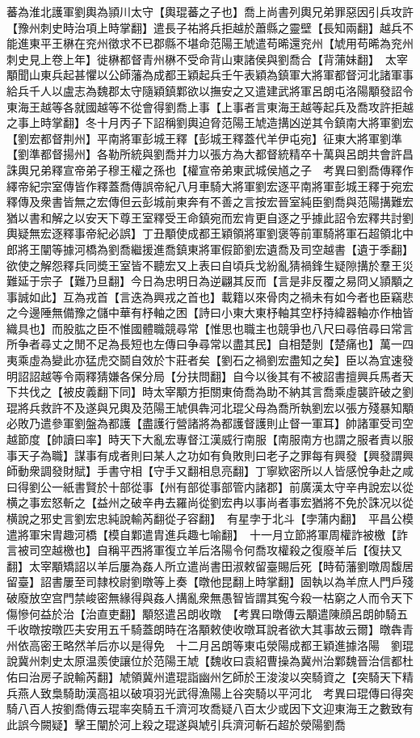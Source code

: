 蕃為淮北護軍劉輿為頴川太守【輿琨蕃之子也】喬上尚書列輿兄弟罪惡因引兵攻許【豫州刺史時治項上時掌翻】遣長子祐將兵拒越於蕭縣之靈壁【長知兩翻】越兵不能進東平王楙在兖州徵求不已郡縣不堪命范陽王虓遣苟晞還兖州【虓用苟晞為兖州刺史見上卷上年】徙楙都督青州楙不受命背山東諸侯與劉喬合【背蒲妹翻】　太宰顒聞山東兵起甚懼以公師藩為成都王穎起兵壬午表穎為鎮軍大將軍都督河北諸軍事給兵千人以盧志為魏郡太守隨穎鎮鄴欲以撫安之又遣建武將軍呂朗屯洛陽顒發詔令東海王越等各就國越等不從會得劉喬上事【上事者言東海王越等起兵及喬攻許拒越之事上時掌翻】冬十月丙子下詔稱劉輿迫脅范陽王虓造搆凶逆其令鎮南大將軍劉宏【劉宏都督荆州】平南將軍彭城王釋【彭城王釋蓋代羊伊屯宛】征東大將軍劉準【劉準都督揚州】各勒所統與劉喬并力以張方為大都督統精卒十萬與呂朗共會許昌誅輿兄弟釋宣帝弟子穆王權之孫也【權宣帝弟東武城侯馗之子　考異曰劉喬傳釋作繹帝紀宗室傳皆作釋蓋喬傳誤帝紀八月車騎大將軍劉宏逐平南將軍彭城王釋于宛宏釋傳及衆書皆無之宏傳但云彭城前東奔有不善之言按宏晉室純臣劉喬與范陽搆難宏猶以書和解之以安天下尊王室釋受王命鎮宛而宏肯更自逐之乎據此詔令宏釋共討劉輿疑無宏逐釋事帝紀必誤】丁丑顒使成都王穎領將軍劉褒等前軍騎將軍石超領北中郎將王闡等據河橋為劉喬繼援進喬鎮東將軍假節劉宏遺喬及司空越書【遺于季翻】欲使之解怨釋兵同奬王室皆不聽宏又上表曰自頃兵戈紛亂猜禍鋒生疑隙搆於羣王災難延于宗子【難乃旦翻】今日為忠明日為逆翩其反而【言是非反覆之易冏乂頴顒之事誠如此】互為戎首【言迭為興戎之首也】載籍以來骨肉之禍未有如今者也臣竊悲之今邊陲無備豫之儲中華有杼軸之困【詩曰小東大東杼軸其空杼持緯器軸亦作柚皆織具也】而股肱之臣不惟國體職競尋常【惟思也職主也競爭也八尺曰尋倍尋曰常言所争者尋丈之閒不足為長短也左傳曰争尋常以盡其民】自相楚剝【楚痛也】萬一四夷乘虛為變此亦猛虎交鬬自效於卞莊者矣【劉石之禍劉宏盡知之矣】臣以為宜速發明詔詔越等令兩釋猜嫌各保分局【分扶問翻】自今以後其有不被詔書擅興兵馬者天下共伐之【被皮義翻下同】時太宰顒方拒關東倚喬為助不納其言喬乘虛襲許破之劉琨將兵救許不及遂與兄輿及范陽王虓俱犇河北琨父母為喬所執劉宏以張方殘暴知顒必敗乃遣參軍劉盤為都護【盡護行營諸將為都護督護則止督一軍耳】帥諸軍受司空越節度【帥讀曰率】時天下大亂宏專督江漢威行南服【南服南方也謂之服者責以服事天子為職】謀事有成者則曰某人之功如有負敗則曰老子之罪每有興發【興發謂興師動衆調發財賦】手書守相【守手又翻相息亮翻】丁寧欵密所以人皆感悅争赴之咸曰得劉公一紙書賢於十部從事【州有部從事部管内諸郡】前廣漢太守辛冉說宏以從横之事宏怒斬之【益州之破辛冉去羅尚從劉宏冉以事尚者事宏猶將不免於誅况以從横說之邪史言劉宏忠純說輸芮翻從子容翻】　有星孛于北斗【孛蒲内翻】　平昌公模遣將軍宋胄趣河橋【模自鄴遣胄進兵趣七喻翻】　十一月立節將軍周權詐被檄【詐言被司空越檄也】自稱平西將軍復立羊后洛陽令何喬攻權殺之復廢羊后【復扶又翻】太宰顒矯詔以羊后屢為姦人所立遣尚書田淑敕留臺賜后死【時荀藩劉暾周馥居留臺】詔書屢至司隸校尉劉暾等上奏【暾他昆翻上時掌翻】固執以為羊庶人門戶殘破廢放空宫門禁峻密無緣得與姦人搆亂衆無愚智皆謂其寃今殺一枯窮之人而令天下傷慘何益於治【治直吏翻】顒怒遣呂朗收暾　【考異曰暾傳云顒遣陳顔呂朗帥騎五千收暾按暾匹夫安用五千騎蓋朗時在洛顒敕使收暾耳說者欲大其事故云爾】暾犇青州依高密王略然羊后亦以是得免　十二月呂朗等東屯滎陽成都王穎進據洛陽　劉琨說冀州刺史太原温羨使讓位於范陽王虓【魏收曰袁紹曹操為冀州治鄴魏晉治信都杜佑曰治房子說輸芮翻】虓領冀州遣琨詣幽州乞師於王浚浚以突騎資之【突騎天下精兵燕人致梟騎助漢高祖以破項羽光武得漁陽上谷突騎以平河北　考異曰琨傳曰得突騎八百人按劉喬傳云琨率突騎五千濟河攻喬疑八百太少或因下文迎東海王之數致有此誤今闕疑】擊王闡於河上殺之琨遂與虓引兵濟河斬石超於滎陽劉喬
